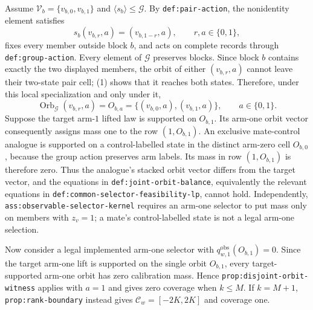 Assume \(\mathcal V_b=\{v_{b,0},v_{b,1}\}\) and \(\langle s_b\rangle\le\mathcal G\). By \texttt{def:pair-action}, the nonidentity element satisfies
\[
s_b(v_{b,r},a)=(v_{b,1-r},a),\qquad r,a\in\{0,1\},
\tag{1}
\]
fixes every member outside block \(b\), and acts on complete records through \texttt{def:group-action}. Every element of \(\mathcal G\) preserves blocks. Since block \(b\) contains exactly the two displayed members, the orbit of either \((v_{b,r},a)\) cannot leave their two-state pair cell; (1) shows that it reaches both states. Therefore, under this local specialization and only under it,
\[
\operatorname{Orb}_{\mathcal G}(v_{b,r},a)=O_{b,a}=\{(v_{b,0},a),(v_{b,1},a)\},\qquad a\in\{0,1\}.
\tag{2}
\]
Suppose the target arm-\(1\) lifted law is supported on \(O_{b,1}\). Its arm-one orbit vector consequently assigns mass one to the row \((1,O_{b,1})\). An exclusive mate-control analogue is supported on a control-labelled state in the distinct arm-zero cell \(O_{b,0}\), because the group action preserves arm labels. Its mass in row \((1,O_{b,1})\) is therefore zero. Thus the analogue's stacked orbit vector differs from the target vector, and the equations in \texttt{def:joint-orbit-balance}, equivalently the relevant equations in \texttt{def:common-selector-feasibility-lp}, cannot hold. Independently, \texttt{ass:observable-selector-kernel} requires an arm-one selector to put mass only on members with \(z_v=1\); a mate's control-labelled state is not a legal arm-one selection.

Now consider a legal implemented arm-one selector with \(q^{\mathrm{obs}}_{w,1}(O_{b,1})=0\). Since the target arm-one lift is supported on the single orbit \(O_{b,1}\), every target-supported arm-one orbit has zero calibration mass. Hence \texttt{prop:disjoint-orbit-witness} applies with \(a=1\) and gives zero coverage when \(k\le M\). If \(k=M+1\), \texttt{prop:rank-boundary} instead gives \(\mathcal C_w=[-2K,2K]\) and coverage one.